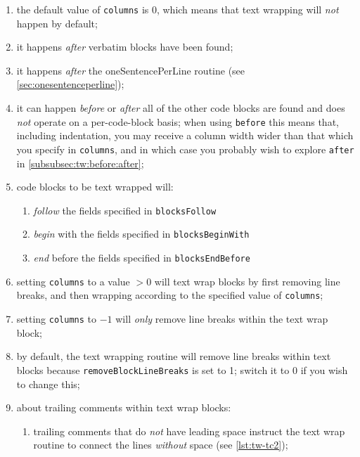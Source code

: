  \begin{enumerate}
  \item the default value of \texttt{columns} is 0, which means that text wrapping will
        \emph{not} happen by default;
  \item it happens \emph{after} verbatim blocks have been found;
  \item it happens \emph{after} the oneSentencePerLine routine (see
        \cref{sec:onesentenceperline});
  \item it can happen \emph{before} or \emph{after}  all of the other code blocks are found and does \emph{not} operate
        on a per-code-block basis; when using \texttt{before} this means that, including
        indentation, you may receive a column width wider than that which you specify in
        \texttt{columns}, and in which case you probably wish to explore \texttt{after}
        in \cref{subsubsec:tw:before:after};
  \item code blocks to be text wrapped will:
        \begin{enumerate}
         \item \emph{follow} the fields specified in \texttt{blocksFollow}
         \item \emph{begin} with the fields specified in \texttt{blocksBeginWith}
         \item \emph{end} before the fields specified in \texttt{blocksEndBefore}
        \end{enumerate}
  \item setting \texttt{columns} to a value $>0$ will text wrap blocks by first removing
        line breaks, and then wrapping according to the specified value of
        \texttt{columns};
  \item setting \texttt{columns} to $-1$ will \emph{only} remove line breaks within the
        text wrap block;
  \item by default, the text wrapping routine will remove line breaks within text blocks
        because \texttt{removeBlockLineBreaks} is set to 1; switch it to 0 if you wish to
        change this;
  \item about trailing comments within text wrap blocks:
        \begin{enumerate}
         \item trailing comments that do \emph{not} have leading space instruct the text
               wrap routine to connect the lines \emph{without} space (see
               \cref{lst:tw-tc2});

\end{enumerate}
\end{enumerate}
